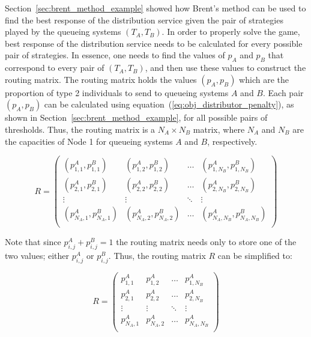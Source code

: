 Section~\ref{sec:brent_method_example} showed how Brent's method can be used to
find the best response of the distribution service given the pair of strategies
played by the queueing systems \((T_A, T_B)\).
In order to properly solve the game, best response of the distribution service
needs to be calculated for every possible pair of strategies.
In essence, one needs to find the values of \(p_A\) and \(p_B\) that correspond
to every pair of \((T_A, T_B)\), and then use these values to construct the
routing matrix.
The routing matrix holds the values \((p_A, p_B)\) which are the proportion
of type 2 individuals to send to queueing systems \(A\) and \(B\).
Each pair \((p_A, p_B)\) can be calculated using
equation~(\ref{eq:obj_distributor_penalty}), as shown in
Section~\ref{sec:brent_method_example}, for all possible pairs of thresholds.
Thus, the routing matrix is a \(N_A \times N_B\) matrix, where \(N_A\) and
\(N_B\) are the capacities of Node 1 for queueing systems \(A\) and \(B\),
respectively.

\begin{equation}\label{eq:routing_matrix}
    R =
    \begin{pmatrix}
        (p_{1,1}^A, p_{1,1}^B) & (p_{1,2}^A, p_{1,2}^B) & \dots &
        (p_{1,N_B}^A, p_{1,N_B}^B) \\
        (p_{2,1}^A, p_{2,1}^B) & (p_{2,2}^A, p_{2,2}^B) & \dots &
        (p_{2,N_B}^A, p_{2,N_B}^B) \\
        \vdots & \vdots & \ddots & \vdots \\
        (p_{N_A,1}^A, p_{N_A,1}^B) & (p_{N_A,2}^A, p_{N_A,2}^B) & \dots &
        (p_{N_A,N_B}^A, p_{N_A,N_B}^B) \\
    \end{pmatrix}
\end{equation}

Note that since \(p_{i,j}^A + p_{i,j}^B = 1\) the routing matrix needs only to
store one of the two values; either \(p_{i,j}^A\) or \(p_{i,j}^B\).
Thus, the routing matrix \(R\) can be simplified to:

\begin{equation}\label{eq:routing_matrix_simplified}
    R =
    \begin{pmatrix}
        p_{1,1}^A & p_{1,2}^A & \dots & p_{1,N_B}^A \\
        p_{2,1}^A & p_{2,2}^A & \dots & p_{2,N_B}^A \\
        \vdots & \vdots & \ddots & \vdots \\
        p_{N_A,1}^A & p_{N_A,2}^A & \dots & p_{N_A,N_B}^A \\
    \end{pmatrix}
\end{equation}


